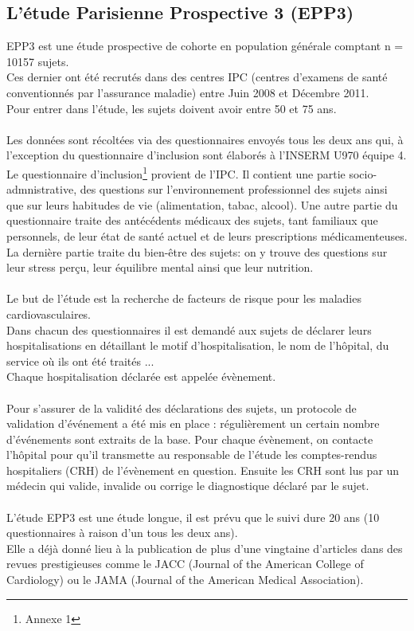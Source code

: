 \documentclass{book}
\begin{document}
\subsection{L'étude Parisienne Prospective 3 (EPP3)}
\noindent
EPP3 \cite{empana_paris_2011} est une étude prospective de cohorte en population générale comptant n = 10157 sujets.\\
Ces dernier ont été recrutés dans des centres IPC (centres d'examens de santé conventionnés par l'assurance maladie) entre Juin 2008 et Décembre 2011.\\
Pour entrer dans l'étude, les sujets doivent avoir entre 50 et 75 ans.\\
\\
Les données sont récoltées via des questionnaires envoyés tous les deux ans qui, à l'exception du questionnaire d'inclusion sont élaborés à l'INSERM U970 équipe 4. \\
Le questionnaire d'inclusion\footnote{Annexe 1} provient de l'IPC. Il contient une partie socio-admnistrative, des questions sur l'environnement professionnel des sujets ainsi que sur leurs habitudes de vie (alimentation, tabac, alcool). 
Une autre partie du questionnaire traite des antécédents médicaux des sujets, tant familiaux que personnels, de leur état de santé actuel et de leurs prescriptions médicamenteuses.
La dernière partie traite du bien-être des sujets: on y trouve des questions sur leur stress perçu, leur équilibre mental ainsi que leur nutrition.\\
\\
Le but de l'étude est la recherche de facteurs de risque pour les maladies cardiovasculaires.\\ 
Dans chacun des questionnaires il est demandé aux sujets de déclarer leurs hospitalisations en détaillant le motif d'hospitalisation, le nom de l'hôpital, du service où ils ont été traités ...\\
Chaque hospitalisation déclarée est appelée évènement.\\
\\
Pour s'assurer de la validité des déclarations des sujets, un protocole de validation d'événement a été mis en place : régulièrement un certain nombre d'événements sont extraits de la base. Pour chaque évènement, on contacte l'hôpital pour qu'il transmette au responsable de l'étude les comptes-rendus hospitaliers (CRH) de l'évènement en question. Ensuite les CRH sont lus par un médecin qui valide, invalide ou corrige le diagnostique déclaré par le sujet.\\
\\
L'étude EPP3 est une étude longue, il est prévu que le suivi dure 20 ans (10 questionnaires à raison d'un tous les deux ans).\\
Elle a déjà donné lieu à la publication de plus d'une vingtaine d'articles dans des revues prestigieuses comme le JACC (Journal of the American College of Cardiology) ou le JAMA (Journal of the American Medical Association).\\
\end{document}
